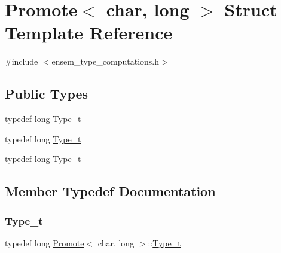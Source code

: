 \hypertarget{structPromote_3_01char_00_01long_01_4}{}\section{Promote$<$ char, long $>$ Struct Template Reference}
\label{structPromote_3_01char_00_01long_01_4}


{\ttfamily \#include $<$ensem\+\_\+type\+\_\+computations.\+h$>$}

\subsection*{Public Types}
\begin{DoxyCompactItemize}
\item 
typedef long \mbox{\hyperlink{structPromote_3_01char_00_01long_01_4_a1f06e3372fb9659a4cba391658ec5883}{Type\+\_\+t}}
\item 
typedef long \mbox{\hyperlink{structPromote_3_01char_00_01long_01_4_a1f06e3372fb9659a4cba391658ec5883}{Type\+\_\+t}}
\item 
typedef long \mbox{\hyperlink{structPromote_3_01char_00_01long_01_4_a1f06e3372fb9659a4cba391658ec5883}{Type\+\_\+t}}
\end{DoxyCompactItemize}


\subsection{Member Typedef Documentation}
\mbox{\label{structPromote_3_01char_00_01long_01_4_a1f06e3372fb9659a4cba391658ec5883}} 
\subsubsection{\texorpdfstring{Type\_t}{Type\_t}\hspace{0.1cm}{\footnotesize\ttfamily [1/3]}}
{\footnotesize\ttfamily typedef long \mbox{\hyperlink{structPromote}{Promote}}$<$ char, long $>$\+::\mbox{\hyperlink{structPromote_3_01char_00_01long_01_4_a1f06e3372fb9659a4cba391658ec5883}{Type\+\_\+t}}}

\mbox{\label{structPromote_3_01char_00_01long_01_4_a1f06e3372fb9659a4cba391658ec5883}} 
